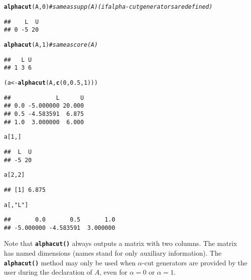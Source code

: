 \documentclass[11pt]{article}\usepackage[]{graphicx}\usepackage[]{color}
\makeatletter
\newcommand{\hlnum}[1]{\textcolor[rgb]{0.686,0.059,0.569}{#1}}%
\newcommand{\hlstr}[1]{\textcolor[rgb]{0.192,0.494,0.8}{#1}}%
\newcommand{\hlcom}[1]{\textcolor[rgb]{0.678,0.584,0.686}{\textit{#1}}}%
\newcommand{\hlstd}[1]{\textcolor[rgb]{0.345,0.345,0.345}{#1}}%
\newcommand{\hlkwb}[1]{\textcolor[rgb]{0.69,0.353,0.396}{#1}}%
\newcommand{\hlkwd}[1]{\textcolor[rgb]{0.737,0.353,0.396}{\textbf{#1}}}%
\newenvironment{kframe}{%
 \def\at@end@of@kframe{}%
 \ifinner\ifhmode%
  \def\at@end@of@kframe{\end{minipage}}%
  \begin{minipage}{\columnwidth}%
 \fi\fi%
 \def\FrameCommand##1{\hskip\@totalleftmargin \hskip-\fboxsep
 \colorbox{shadecolor}{##1}\hskip-\fboxsep
     \hskip-\linewidth \hskip-\@totalleftmargin \hskip\columnwidth}%
 \MakeFramed {\advance\hsize-\width
   \@totalleftmargin\z@ \linewidth\hsize
   \@setminipage}}%
 {\par\unskip\endMakeFramed%
 \at@end@of@kframe}
\newenvironment{knitrout}{}{} %
\newcommand{\func}[1]{\texttt{\hlkwd{#1}}}
\makeatother
\begin{document}
\begin{knitrout}\small
{}\color{fgcolor}\begin{kframe}
\begin{alltt}
\hlkwd{alphacut}\hlstd{(A,} \hlnum{0}\hlstd{)} \hlcom{# same as supp(A) (if alpha-cut generators are defined)}
\end{alltt}
\begin{verbatim}
##    L  U
## 0 -5 20
\end{verbatim}
\begin{alltt}
\hlkwd{alphacut}\hlstd{(A,} \hlnum{1}\hlstd{)} \hlcom{# same as core(A)}
\end{alltt}
\begin{verbatim}
##   L U
## 1 3 6
\end{verbatim}
\begin{alltt}
\hlstd{(a} \hlkwb{<-} \hlkwd{alphacut}\hlstd{(A,} \hlkwd{c}\hlstd{(}\hlnum{0}\hlstd{,} \hlnum{0.5}\hlstd{,} \hlnum{1}\hlstd{)))}
\end{alltt}
\begin{verbatim}
##             L      U
## 0.0 -5.000000 20.000
## 0.5 -4.583591  6.875
## 1.0  3.000000  6.000
\end{verbatim}
\begin{alltt}
\hlstd{a[}\hlnum{1}\hlstd{, ]}
\end{alltt}
\begin{verbatim}
##  L  U 
## -5 20
\end{verbatim}
\begin{alltt}
\hlstd{a[}\hlnum{2}\hlstd{,} \hlnum{2}\hlstd{]}
\end{alltt}
\begin{verbatim}
## [1] 6.875
\end{verbatim}
\begin{alltt}
\hlstd{a[,} \hlstr{"L"}\hlstd{]}
\end{alltt}
\begin{verbatim}
##       0.0       0.5       1.0 
## -5.000000 -4.583591  3.000000
\end{verbatim}
\end{kframe}
\end{knitrout}

\noindent
Note that \func{alphacut()} always outputs a matrix with two columns.
The matrix has named dimensions (names stand for only auxiliary information).
The \func{alphacut()} method may only be used when $\alpha$-cut generators are
provided by the user during the declaration of $A$, even for $\alpha=0$
or $\alpha=1$.
\end{document}
